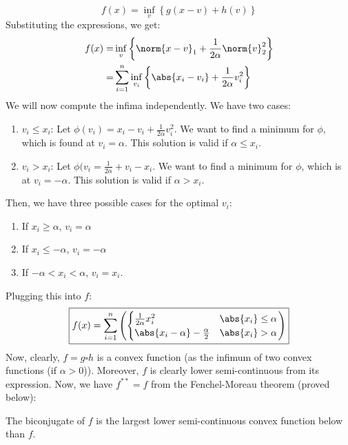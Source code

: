 \documentclass[math, info]{cours}
\begin{document}
\begin{itemize}
\begin{equation*}
			f(x) = \inf_{v} \left\{ g(x - v) + h(v) \right\}
		\end{equation*}
		Substituting the expressions, we get:
		\begin{equation*}
			\begin{aligned}
				f(x) =& \inf_{v}\left\{ \norm{x - v}_{1} + \frac{1}{2\alpha}\norm{v}_{2}^{2} \right\}\\
				=& \sum_{i = 1}^{n} \inf_{v_{i}} \left\{ \abs{x_{i} - v_{i}} + \frac{1}{2\alpha}v_{i}^{2} \right\}
			\end{aligned}
		\end{equation*}
		We will now compute the infima independently. We have two cases:
		\begin{enumerate}
			\item $v_{i} \leq x_{i}$: Let $\phi(v_{i}) = x_{i} - v_{i} + \frac{1}{2\alpha}v_{i}^{2}$. We want to find a minimum for $\phi$, which is found at $v_{i} = \alpha$. This solution is valid if $\alpha \leq x_{i}$.
			\item $v_{i} > x_{i}$: Let $\phi(v_{i} = \frac{1}{2\alpha} + v_{i} - x_{i}$. We want to find a minimum for $\phi$, which is at $v_{i} = -\alpha$. This solution is valid if $\alpha > x_{i}$.
		\end{enumerate}
		Then, we have three possible cases for the optimal $v_{i}$:
		\begin{enumerate}
			\item If $x_{i} \geq \alpha$, $v_{i} = \alpha$
			\item If $x_{i} \leq -\alpha$, $v_{i} = -\alpha$
			\item If $-\alpha < x_{i} < \alpha$, $v_{i} = x_{i}$.
		\end{enumerate}
		Plugging this into $f$:
		\begin{equation*}
			\boxed{%
			f(x) = \sum_{i = 1}^{n} \left( \begin{cases}
					\frac{1}{2\alpha}x_{i}^{2} & \abs{x_{i}}\leq \alpha\\
					\abs{x_{i} - \alpha} - \frac{\alpha}{2} & \abs{x_{i}} > \alpha
		\end{cases}\right)}
		\end{equation*}
		Now, clearly, $f = g\square h$ is a convex function (as the infimum of two convex functions (if $\alpha > 0$)).
		Moreover, $f$ is clearly lower semi-continuous from its expression.
		Now, we have $\boxed{f^{**} = f}$ from the Fenchel-Moreau theorem (proved below):
		\begin{thm}
			The biconjugate of $f$ is the largest lower semi-continuous convex function below than $f$.

\end{thm}
\end{itemize}
\end{document}
